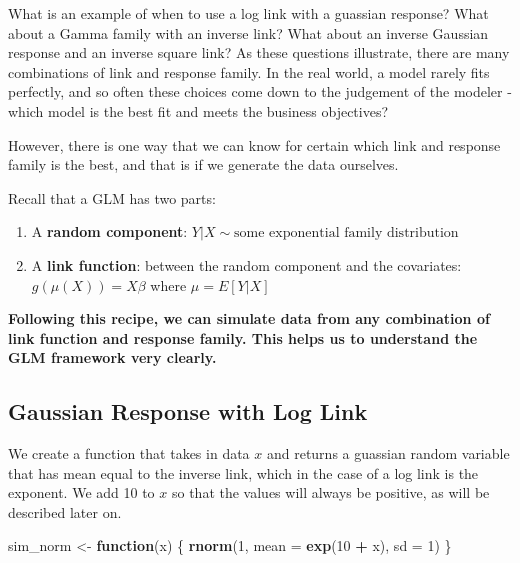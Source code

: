 \documentclass[openany]{book}
\newenvironment{Shaded}{\begin{snugshade}}{\end{snugshade}}
\newcommand{\ControlFlowTok}[1]{\textcolor[rgb]{0.13,0.29,0.53}{\textbf{#1}}}
\newcommand{\DataTypeTok}[1]{\textcolor[rgb]{0.13,0.29,0.53}{#1}}
\newcommand{\DecValTok}[1]{\textcolor[rgb]{0.00,0.00,0.81}{#1}}
\newcommand{\KeywordTok}[1]{\textcolor[rgb]{0.13,0.29,0.53}{\textbf{#1}}}
\newcommand{\NormalTok}[1]{#1}
\newcommand{\OperatorTok}[1]{\textcolor[rgb]{0.81,0.36,0.00}{\textbf{#1}}}
\newcommand{\StringTok}[1]{\textcolor[rgb]{0.31,0.60,0.02}{#1}}
\begin{document}
What is an example of when to use a log link with a guassian response? What about a Gamma family with an inverse link? What about an inverse Gaussian response and an inverse square link? As these questions illustrate, there are many combinations of link and response family. In the real world, a model rarely fits perfectly, and so often these choices come down to the judgement of the modeler - which model is the best fit and meets the business objectives?

However, there is one way that we can know for certain which link and response family is the best, and that is if we generate the data ourselves.

Recall that a GLM has two parts:

\begin{enumerate}
\def\labelenumi{\arabic{enumi}.}
\item
  A \textbf{random component}: \(Y|X \sim \text{some exponential family distribution}\)
\item
  A \textbf{link function}: between the random component and the covariates: \(g(\mu(X)) = X\beta\) where \(\mu = E[Y|X]\)
\end{enumerate}

\textbf{Following this recipe, we can simulate data from any combination of link function and response family. This helps us to understand the GLM framework very clearly.}

\hypertarget{gaussian-response-with-log-link}{%
\subsection{Gaussian Response with Log Link}\label{gaussian-response-with-log-link}}

We create a function that takes in data \(x\) and returns a guassian random variable that has mean equal to the inverse link, which in the case of a log link is the exponent. We add 10 to \(x\) so that the values will always be positive, as will be described later on.

\begin{Shaded}
\begin{Highlighting}[]
\NormalTok{sim_norm <-}\StringTok{ }\ControlFlowTok{function}\NormalTok{(x) \{}
  \KeywordTok{rnorm}\NormalTok{(}\DecValTok{1}\NormalTok{, }\DataTypeTok{mean =} \KeywordTok{exp}\NormalTok{(}\DecValTok{10} \OperatorTok{+}\StringTok{ }\NormalTok{x), }\DataTypeTok{sd =} \DecValTok{1}\NormalTok{)}
\NormalTok{\}}
\end{Highlighting}
\end{Shaded}
\end{document}
